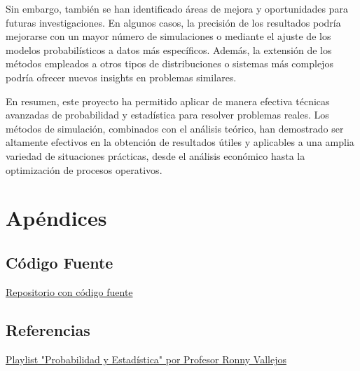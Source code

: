 \documentclass[12pt]{article}
\begin{document}
Sin embargo, también se han identificado áreas de mejora y oportunidades para futuras investigaciones. En algunos casos, la precisión de los resultados podría mejorarse con un mayor número de simulaciones o mediante el ajuste de los modelos probabilísticos a datos más específicos. Además, la extensión de los métodos empleados a otros tipos de distribuciones o sistemas más complejos podría ofrecer nuevos insights en problemas similares.

En resumen, este proyecto ha permitido aplicar de manera efectiva técnicas avanzadas de probabilidad y estadística para resolver problemas reales. Los métodos de simulación, combinados con el análisis teórico, han demostrado ser altamente efectivos en la obtención de resultados útiles y aplicables a una amplia variedad de situaciones prácticas, desde el análisis económico hasta la optimización de procesos operativos.


\section{Apéndices}
\subsection{Código Fuente}
\href{https://github.com/Karimtek/MAT043-PRO}{Repositorio con código fuente}


\subsection{Referencias}

\href{https://www.youtube.com/playlist?list=PLRdsr8w_wLNzYYSYP6bvf1p30mo27X9q-}{Playlist "Probabilidad y Estadística" por Profesor Ronny Vallejos}
\end{document}
